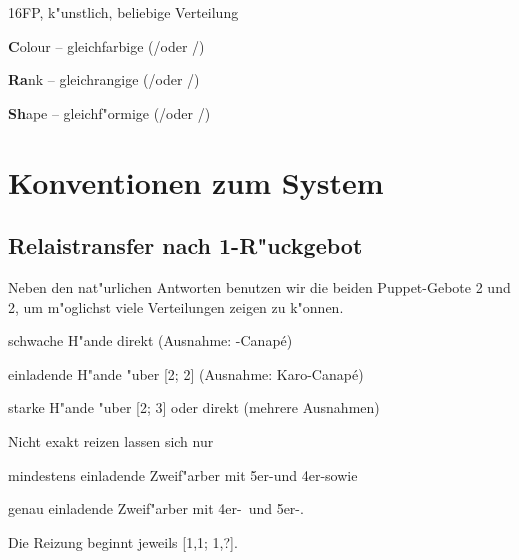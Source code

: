 \bdsc
\item[(1\tre)] 16\pl FP, k"unstlich, beliebige Verteilung
\bdsc
\item[\kontra] \textbf{C}olour -- gleichfarbige (\tr/\pi oder \ka/\co)
\item[1\kar] \textbf{Ra}nk -- gleichrangige (\tr/\ka oder \co/\pi)
\item[1\of] \nat
\item[1\SA] \textbf{Sh}ape -- gleichf"ormige (\tr/\co oder \ka/\pi)
\item[2\uf] \nat
\edsc
\edsc

\newpage
\section{Konventionen zum System}

%
%
\subsection{Relaistransfer nach 1\SA-R"uckgebot} \label{1sarebid}

Neben den nat"urlichen Antworten benutzen wir die beiden Puppet-Gebote 2\tre
und 2\SA, um m"oglichst viele Verteilungen zeigen zu k"onnen.

\begin{compactitem}
\item schwache H"ande direkt (Ausnahme: \ufa-Canap\'e)
\item einladende H"ande "uber [2\tre; 2\kar{}] (Ausnahme:
  Karo-Canap\'e)
\item starke H"ande "uber [2\SA; 3\tre{}] oder direkt (mehrere Ausnahmen)
\end{compactitem}

Nicht exakt reizen lassen sich nur
\begin{compactitem}
\item mindestens einladende Zweif"arber mit 5er-\ofa und 4er-\ufa sowie
\item genau einladende Zweif"arber mit 4er-\ofa\ und 5er-\tr.
\end{compactitem}

Die Reizung beginnt jeweils [1\anybid{}\sep1\of; 1\SA{}\sep?].

